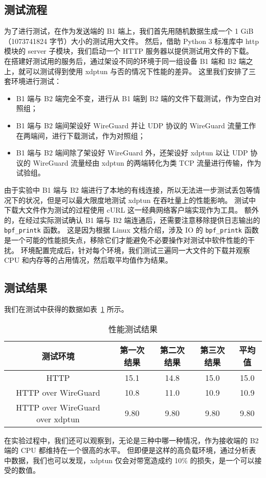 \subsection{测试流程}

为了进行测试，在作为发送端的 B1 端上，我们首先用随机数据生成一个 1 GiB（1073741824 字节）大小的测试用大文件。
然后，借助 Python 3 标准库中 http 模块的 server 子模块，我们启动一个 HTTP 服务器以提供测试用文件的下载。
在搭建好测试用的服务后，通过架设不同的环境于同一组设备 B1 端和 B2 端之上，就可以测试得到使用 xdptun 与否的情况下性能的差异。
这里我们安排了三套环境进行测试：

\begin{itemize}
  \item B1 端与 B2 端完全不变，进行从 B1 端到 B2 端的文件下载测试，作为空白对照组；
  \item B1 端与 B2 端间架设好 WireGuard 并让 UDP 协议的 WireGuard 流量工作在两端间，进行下载测试，作为对照组；
  \item B1 端与 B2 端间除了架设好 WireGuard 外，还架设好 xdptun 以让 UDP 协议的 WireGuard 流量经由 xdptun 的两端转化为类 TCP 流量进行传输，作为试验组。
\end{itemize}

由于实验中 B1 端与 B2 端进行了本地的有线连接，所以无法进一步测试丢包等情况下的状况，但是可以最大限度地测试 xdptun 在吞吐量上的性能影响。
测试中下载大文件作为测试的过程使用 cURL 这一经典网络客户端实现作为工具。
额外的，在经过实际测试确认 B1 端与 B2 端连通后，还需要注意移除提供日志输出的 \texttt{bpf\_printk} 函数。
这是因为根据 Linux 文档介绍，涉及 IO 的 \texttt{bpf\_printk} 函数是一个可能的性能损失点，移除它们才能避免不必要操作对测试中软件性能的干扰。
环境配置完成后，针对每个环境，我们测试三遍同一大文件的下载并观察 CPU 和内存等的占用情况，然后取平均值作为结果。

\subsection{测试结果}

我们在测试中获得的数据如表~\ref{tab:perf-test} 所示。

\begin{table}[h]
  \centering
  \caption{性能测试结果}
  \label{tab:perf-test}
  \begin{tabular}{c c c c c}
    \toprule
    测试环境 & 第一次结果 & 第二次结果 & 第三次结果 & 平均值 \\
    \midrule
    HTTP & 15.1 & 14.8 & 15.0 & 15.0 \\
    HTTP over WireGuard & 10.8 & 11.0 & 10.9 & 10.9 \\
    HTTP over WireGuard over xdptun & 9.80 & 9.80 & 9.80 & 9.80 \\
    \bottomrule
  \end{tabular}
\end{table}

在实验过程中，我们还可以观察到，无论是三种中哪一种情况，作为接收端的 B2 端的 CPU 都维持在一个很高的水平。
但即便是这样的高负载环境，通过分析表中数据，我们也可以发现，xdptun 仅会对带宽造成约 10\% 的损失，是一个可以接受的数值。
